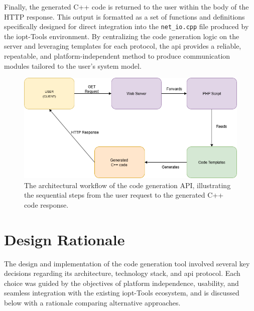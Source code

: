 Finally, the generated C++ code is returned to the user within the body of the HTTP response. This output is formatted as a set of functions and definitions specifically designed for direct integration into the \texttt{net\_io.cpp} file produced by the \gls{iopt}-Tools environment. By centralizing the code generation logic on the server and leveraging templates for each protocol, the \gls{api} provides a reliable, repeatable, and platform-independent method to produce communication modules tailored to the user’s system model.

\begin{figure}[h!]
   \centering
   \includegraphics[width=1\textwidth]{Chapters/Figures/apiWorkflow.png}
   \caption{The architectural workflow of the code generation API, illustrating the sequential steps from the user request to the generated C++ code response.}
   \label{fig:api_Workflow}
\end{figure}



\section{Design Rationale}
\label{sec:design_rationale}


The design and implementation of the code generation tool involved several key decisions regarding its architecture, technology stack, and \gls{api} protocol. Each choice was guided by the objectives of platform independence, usability, and seamless integration with the existing \gls{iopt}-Tools ecosystem, and is discussed below with a rationale comparing alternative approaches.

